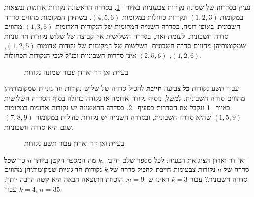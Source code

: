 נעיין בסדרות של שמונה נקודות צבעוניות באיור%
~\ref{f.vdw1}.
בסדרה הראשונה נקודות אדומות נמצאות במקומות
$(1,2,3)$
ונקודות כחולות במקומות
$(4,5,6)$.
בשתיהן המקומות מהווים סדרה חשבונית. באופן דומה, בסדרה השנייה המקומות של הנקודות האדומות
$(1,3,5)$
מהווים סדרה חשבונית. לעומת זאת, בסדרה השלישית אין קבוצה של שלוש נקודות חד-גוניות שמקומותיהן מהווים סדרה חשבונית. השלשות של המקומות של נקודות אדומות 
$(1,2,5)$, $(1,2,6)$, $(2,5,6)$
אינן סדרות חשבוניות וכנ"ל לגבי הנקודות הכחולות.
\begin{figure}[htb]
\begin{center}
\end{center}
\caption{בעיית ואן דר וארדן עבור שמונה נקודות}\label{f.vdw1}
\end{figure}

עבור תשע נקודות
\textbf{כל}
צביעה
\textbf{חייבת}
להכיל סדרה של שלוש נקודות חד-גוניות שמקומותיהן מהווים סדרה חשבונית. למשל, נוסיף נקודה אדומה או נקודה כחולה בסוף הסדרה השלישית באיור%
~\ref{f.vdw1}
ונקבל את הסדרות בסעיף%
~\ref{f.vdw2}.
בסדרה הראשונה יש נקודות אדומות במקומות
$(1,5,9)$
שהיא סדרה חשבונית, ובסדרה השנייה יש נקודות כחולות במקומות 
$(7,8,9)$
שגם היא סדרה חשבוניות.
\begin{figure}[htb]
\begin{center}
\end{center}
\caption{בעיית ואן דר וארדן עבור תשע נקודות}\label{f.vdw2}
\end{figure}
ואן דר וארדן
הציג את הבעיה:
לכל מספר שלם חיובי
$k,$
מה המספר הקטן ביותר 
$n$
כך 
\textbf{שכל}
סדרה של 
$n$
נקודות צבעוניות
\textbf{חייבת להכיל}
סדרה של
$k$
נקודות חד-גוניות שמקומותיהן מהווים סדרה חשבונית? עבור
$k=3$
ראינו ש-%
$n=9$.
הוכחת התוצאה הבאה היא קשה הרבה יותר: עבור
$k=4$, $n=35$.

